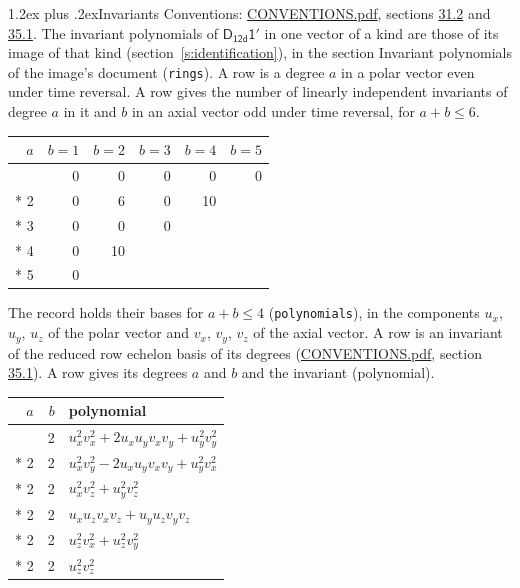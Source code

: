 \documentclass[10pt,a4paper]{article}
\makeatletter
\renewcommand\section{\@startsection{section}{1}{\z@}{-3ex plus -1ex minus -.2ex}%
  {1.2ex plus .2ex}{\normalfont\large\sffamily\bfseries\color{parttitle}}}
\numberwithin{equation}{section}
\newcommand{\grp}[1]{\mathsf{#1}}
\makeatother
\begin{document}
\section{Invariants}\label{s:invariants}
Conventions: \href{../../CONVENTIONS.pdf}{CONVENTIONS.pdf}, sections \href{../../CONVENTIONS.pdf\#conv.31.2}{31.2} and \href{../../CONVENTIONS.pdf\#conv.35.1}{35.1}.
The invariant polynomials of $\grp{D_{12d}1'}$ in one vector of a kind are those of its image of that kind (section~\ref{s:identification}), in the section Invariant polynomials of the image's document (\texttt{rings}).
\leavevmode\label{n:index.degree.polar}\label{n:index.degree.axial}A row is a degree $a$ in a polar vector even under time reversal. A row gives the number of linearly independent invariants of degree $a$ in it and $b$ in an axial vector odd under time reversal, for $a + b \le 6$.
{\small\begin{longtable}{@{}rrrrrr@{}}\toprule
$a$ & $b = 1$ & $b = 2$ & $b = 3$ & $b = 4$ & $b = 5$\\\midrule\endhead
\bottomrule\endfoot\endlastfoot
1 & 0 & 0 & 0 & 0 & 0\\*
2 & 0 & 6 & 0 & 10 & \\*
3 & 0 & 0 & 0 &  & \\*
4 & 0 & 10 &  &  & \\*
5 & 0 &  &  &  & \\
\bottomrule\end{longtable}}
\leavevmode\label{n:local.component.polar}\label{n:local.component.axial}The record holds their bases for $a + b \le 4$ (\texttt{polynomials}), in the components $u_{x}$, $u_{y}$, $u_{z}$ of the polar vector and $v_{x}$, $v_{y}$, $v_{z}$ of the axial vector. \label{n:head.polynomial}A row is an invariant of the reduced row echelon basis of its degrees (\href{../../CONVENTIONS.pdf}{CONVENTIONS.pdf}, section \href{../../CONVENTIONS.pdf\#conv.35.1}{35.1}). A row gives its degrees $a$ and $b$ and the invariant (polynomial).
{\small\renewcommand{\arraystretch}{1.2}\begin{longtable}{@{}rrl@{}}\toprule
$a$ & $b$ & polynomial\\\midrule\endhead
\bottomrule\endfoot\endlastfoot
2 & 2 & $u_{x}^{2}v_{x}^{2} + 2u_{x}u_{y}v_{x}v_{y} + u_{y}^{2}v_{y}^{2}$\\*
2 & 2 & $u_{x}^{2}v_{y}^{2} - 2u_{x}u_{y}v_{x}v_{y} + u_{y}^{2}v_{x}^{2}$\\*
2 & 2 & $u_{x}^{2}v_{z}^{2} + u_{y}^{2}v_{z}^{2}$\\*
2 & 2 & $u_{x}u_{z}v_{x}v_{z} + u_{y}u_{z}v_{y}v_{z}$\\*
2 & 2 & $u_{z}^{2}v_{x}^{2} + u_{z}^{2}v_{y}^{2}$\\*
2 & 2 & $u_{z}^{2}v_{z}^{2}$\\
\bottomrule\end{longtable}}
\end{document}
